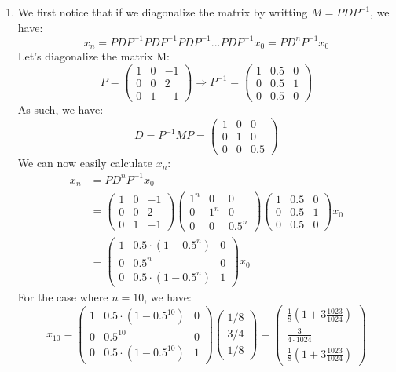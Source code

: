\documentclass[11pt, legalpaper]{article}
\begin{document}
\begin{enumerate}
    \item We first notice that if we diagonalize the matrix by writting $M=PDP^{-1}$, we have:
    $$x_n=PDP^{-1}PDP^{-1}PDP^{-1}...PDP^{-1}x_0=PD^nP^{-1}x_0$$
    Let's diagonalize the matrix M:
    $$P=\begin{pmatrix}
        1 & 0 & -1 \\
        0 & 0 & 2 \\
        0 & 1 & -1
    \end{pmatrix} \Rightarrow  P^{-1}= \begin{pmatrix}
        1 & 0.5 & 0 \\
        0 & 0.5 & 1 \\
        0 & 0.5 & 0
    \end{pmatrix}$$
    As such, we have:
    $$D=P^{-1}M P=\begin{pmatrix}
        1 & 0 & 0 \\
        0 & 1 & 0 \\
        0 & 0 & 0.5
    \end{pmatrix}$$
    We can now easily calculate $x_n$:
    \begin{align*}
        x_n  &=PD^nP^{-1}x_0\\
                &=\begin{pmatrix}
        1 & 0 & -1 \\
        0 & 0 & 2 \\
        0 & 1 & -1
    \end{pmatrix}\begin{pmatrix}
        1^n & 0 & 0 \\
        0 & 1^n & 0 \\
        0 & 0 & 0.5^n
    \end{pmatrix}\begin{pmatrix}
        1 & 0.5 & 0 \\
        0 & 0.5 & 1 \\
        0 & 0.5 & 0
    \end{pmatrix}x_0\\
    &=\begin{pmatrix}
        1 & 0.5\cdot(1-0.5^n) & 0 \\
        0 & 0.5^n & 0 \\
        0 & 0.5\cdot(1-0.5^n) & 1
    \end{pmatrix} x_0
    \end{align*}
    For the case where $n=10$, we have:
    $$\boxed{x_{10}=\begin{pmatrix}
        1 & 0.5\cdot(1-0.5^{10}) & 0 \\
        0 & 0.5^{10} & 0 \\
        0 & 0.5\cdot(1-0.5^{10}) & 1
    \end{pmatrix} \begin{pmatrix} 1/8 \\ 3/4 \\ 1/8 \end{pmatrix}=\begin{pmatrix}\frac{1}{8}(1+3\frac{1023}{1024}) \\ \frac{3}{4\cdot 1024} \\ \frac{1}{8}(1+3\frac{1023}{1024})\end{pmatrix}}$$


\end{enumerate}
\end{document}
